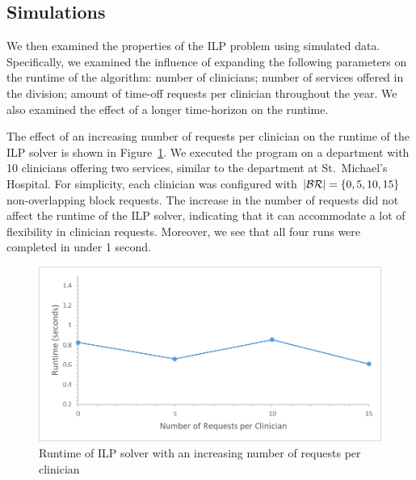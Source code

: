 

\subsection{Simulations}
We then examined the properties of the ILP problem using simulated data.
Specifically, we examined the influence of expanding the following parameters on
the runtime of the algorithm: number of clinicians; number of services offered
in the division; amount of time-off requests per clinician throughout the year.
We also examined the effect of a longer time-horizon on the runtime.

The effect of an increasing number of requests per clinician on the runtime of
the ILP solver is shown in Figure~\ref{fig:runtime-requests}. We executed the
program on a department with 10 clinicians offering two services, similar to the
department at St.\ Michael's Hospital. For simplicity, each clinician was
configured with $\abs{\mathcal{BR}} = \{0, 5, 10, 15\}$ non-overlapping block
requests. The increase in the number of requests did not affect the runtime of
the ILP solver, indicating that it can accommodate a lot of flexibility in
clinician requests. Moreover, we see that all four runs were completed in under
1 second.

\begin{figure}[h]
	\centering
	\includegraphics[scale=.5]{fig/runtime_requests} %
	\caption{Runtime of ILP solver with an increasing number of requests per clinician}
  \label{fig:runtime-requests}
\end{figure}

